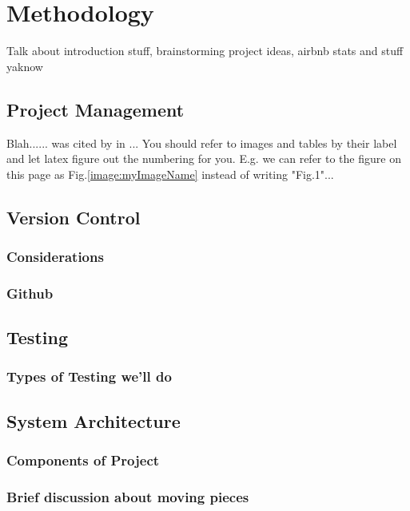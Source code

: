 \chapter{Methodology}
Talk about introduction stuff, brainstorming project ideas, airbnb stats and stuff yaknow 

\section{Project Management}
Blah...... was cited by \cite{MEAN_STACK} in ... You should refer to images and tables by their label and let latex figure out the numbering for you. E.g. we can refer to the figure on this page as Fig.\ref{image:myImageName} instead of writing "Fig.1"...

\section{Version Control}
\subsection{Considerations}
\subsection{Github}




\section{Testing}
\subsection{Types of Testing we'll do}

\section{System Architecture}
\subsection{Components of Project}
\subsection{Brief discussion about moving pieces}



